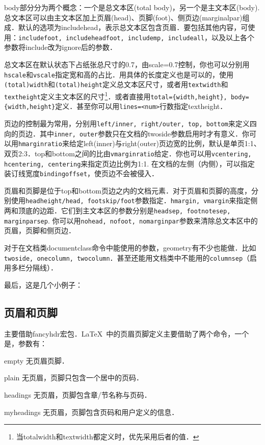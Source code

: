 body部分分为两个概念：一个是总文本区(total body)，另一个是主文本区(body). 总文本区可以由主文本区加上页眉(head)、页脚(foot)、侧页边(marginalpar)组成．默认的选项为includehead，表示总文本区包含页眉．要包括其他内容，可使用：\texttt{includefoot, includeheadfoot, includemp, includeall}，以及以上各个参数将include改为ignore后的参数．

总文本区在默认状态下占纸张总尺寸的0.7，由scale=0.7控制，你也可以分别用\texttt{hscale}和\texttt{vscale}指定宽和高的占比．用具体的长度定义也是可以的，使用\texttt{(total)width}和\texttt{(total)height}定义总文本区尺寸，或者用\texttt{textwidth}和\texttt{textheight}定义主文本区的尺寸\footnote{当totalwidth和textwidth都定义时，优先采用后者的值．}．或者直接用\texttt{total=\{width,height\}, body=\{width,height\}}定义．甚至你可以用\texttt{lines=<num>}行数指定textheight．

页边的控制最为常用，分别用\texttt{left/inner, right/outer, top, bottom}来定义四向的页边．其中\texttt{inner, outer}参数只在文档的twoside参数启用时才有意义．你可以用\texttt{hmarginratio}来给定left(inner)与right(outer)页边宽的比例，默认是单页1:1、双页2:3．top和bottom之间的比由\texttt{vmarginratio}给定．你也可以用\texttt{vcentering, hcentering, centering}来指定页边比例为1:1. 在文档的左侧（内侧），可以指定装订线宽度\texttt{bindingoffset}，使页边不会被侵入．

页眉和页脚是位于top和bottom页边之内的文档元素．对于页眉和页脚的高度，分别使用\texttt{headheight/head, footskip/foot}参数指定．\texttt{hmargin, vmargin}来指定侧两和顶底的边距．它们到主文本区的参数分别是\texttt{headsep, footnotesep, marginparsep}. 你可以用\texttt{nohead, nofoot, nomarginpar}参数来清除总文本区中的页眉，页脚和侧页边．

对于在文档类documentclass命令中能使用的参数，geometry有不少也能做．比如\texttt{twoside, onecolumn, twocolumn}．甚至还能用文档类中不能用的\texttt{columnsep}（启用多栏分隔线）．

最后，这是几个小例子：
\begin{latex}
\usepackage[hmargin=1.25in,vmargin=1in]{geometry}
\usepackage[inner=1in,outer=1.25in]{geometry}
\end{latex}

\subsection{页眉和页脚}
主要借助fancyhdr宏包．\LaTeX\ 中的页眉页脚定义主要借助了两个命令，一个是，参数有：
\begin{para}
\item[empty] 无页眉页脚．
\item[plain] 无页眉，页脚只包含一个居中的页码．
\item[headings] 无页眉，页脚包含章/节名称与页码．
\item[myheadings] 无页眉，页脚包含页码和用户定义的信息．
\end{para}

